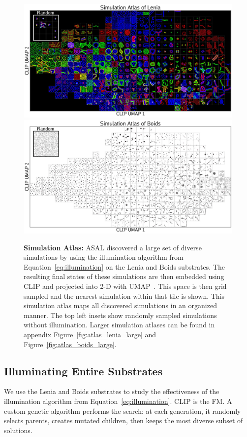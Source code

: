\documentclass{article}
\begin{document}
\begin{figure}[htbp]
    \centering
    \includegraphics[width=\textwidth]{figs/atlas_lenia_compressed.pdf}
    \includegraphics[width=\textwidth]{figs/atlas_boids_compressed.pdf}
    \caption{
    \textbf{Simulation Atlas: }
    ASAL discovered a large set of diverse simulations by using the illumination algorithm from Equation~\ref{eq:illumination} on the Lenia and Boids substrates.
    The resulting final states of these simulations are then embedded using CLIP and projected into 2-D with UMAP~\citep{mcinnes2018umap}.
    This space is then grid sampled and the nearest simulation within that tile is shown.
    This simulation atlas maps all discovered simulations in an organized manner.
    The top left insets show randomly sampled simulations without illumination.
    Larger simulation atlases can be found in appendix Figure~\ref{fig:atlas_lenia_large} and Figure~\ref{fig:atlas_boids_large}.
    }
    \label{fig:atlas}
\end{figure}



\subsection{Illuminating Entire Substrates}
We use the Lenia and Boids substrates to study the effectiveness of the illumination algorithm from Equation~\ref{eq:illumination}.
CLIP is the FM.
A custom genetic algorithm performs the search: at each generation, it randomly selects parents, creates mutated children, then keeps the most diverse subset of solutions.
\end{document}
